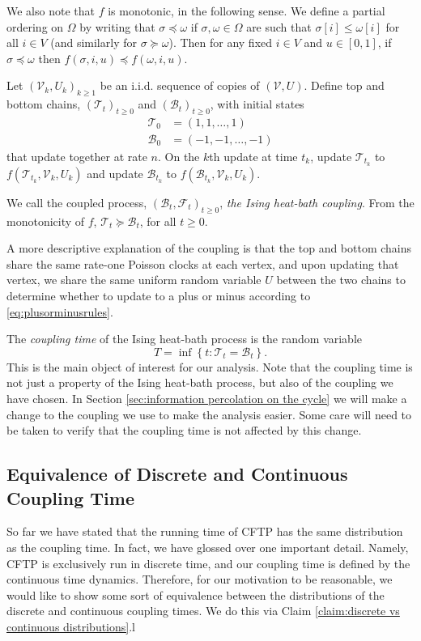 	We also note that $f$ is monotonic, in the following sense. We define a partial ordering on $\Omega$ by writing that $\sigma \preceq \omega$ if $\sigma, \omega \in \Omega$ are such that $\sigma[i] \leq \omega[i]$ for all $i \in V$ (and similarly for $\sigma \succeq \omega$). Then for any fixed $i \in V$ and $u \in [0,1]$, if $\sigma \preceq \omega$ then $f(\sigma, i, u) \preceq f(\omega, i, u)$.
	
	Let $(\mathscr{V}_k, U_k)_{k \geq 1}$ be an i.i.d. sequence of copies of $(\mathscr{V}, U)$. Define top and bottom chains, $(\mathscr{T}_t)_{t\geq0}$ and $(\mathscr{B}_t)_{t\geq0}$, with initial states
	\begin{align}
		\mathscr{T}_0 &= (1, 1, \dots, 1)\\
		\mathscr{B}_0 &= (-1, -1, \dots, -1)
	\end{align}
	that update together at rate $n$. On the $k$th update at time $t_k$, update $\mathscr{T}_{t_k}$ to $f(\mathscr{T}_{t_k}, \mathscr{V}_k, U_k)$ and update $\mathscr{B}_{t_k}$ to $f(\mathscr{B}_{t_k}, \mathscr{V}_k, U_k)$.

	We call the coupled process, $(\mathscr{B}_t, \mathscr{F}_t)_{t\geq0}$, \emph{the Ising heat-bath coupling}. From the monotonicity of $f$, $\mathscr{T}_t \succeq \mathscr{B}_t$, for all $t \geq 0$.

	A more descriptive explanation of the coupling is that the top and bottom chains share the same rate-one Poisson clocks at each vertex, and upon updating that vertex, we share the same uniform random variable $U$ between the two chains to determine whether to update to a plus or minus according to \eqref{eq:plusorminusrules}.

	The \emph{coupling time} of the Ising heat-bath process is the random variable
	\begin{equation}
		T = \inf \left\{t : \mathscr{T}_t = \mathscr{B}_t \right\}.	
	\end{equation}
	This is the main object of interest for our analysis. Note that the coupling time is not just a property of the Ising heat-bath process, but also of the coupling we have chosen. In Section \ref{sec:information percolation on the cycle} we will make a change to the coupling we use to make the analysis easier. Some care will need to be taken to verify that the coupling time is not affected by this change.

	\subsection{Equivalence of Discrete and Continuous Coupling Time}
	So far we have stated that the running time of CFTP has the same distribution as the coupling time. In fact, we have glossed over one important detail. Namely, CFTP is exclusively run in discrete time, and our coupling time is defined by the continuous time dynamics. Therefore, for our motivation to be reasonable, we would like to show some sort of equivalence between the distributions of the discrete and continuous coupling times. We do this via Claim \ref{claim:discrete vs continuous distributions}.l

